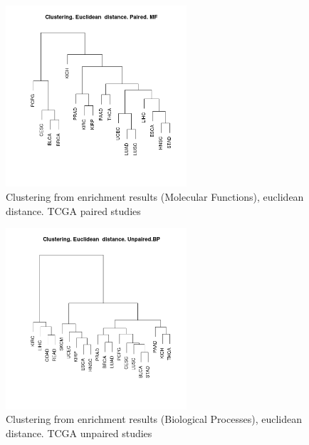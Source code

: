 \documentclass[a4paper,12pt]{article}
\begin{document}
\begin{figure}[!h] 
\centering 
\includegraphics[width=0.6\textwidth]{img/cluster_euclideand_mf_paired.png} 
\caption{Clustering from enrichment results (Molecular Functions), euclidean distance.  TCGA paired studies} 
\label{figCLUST_eu_mf_paired} 
\end{figure} 



\begin{figure}[!h] 
\centering 
\includegraphics[width=0.6\textwidth]{img/cluster_euclideand_bp_unpaired.png} 
\caption{Clustering from enrichment results (Biological Processes), euclidean distance.  TCGA unpaired studies} 
\label{figCLUST_eu_bp_unpaired} 
\end{figure} 
\end{document}
